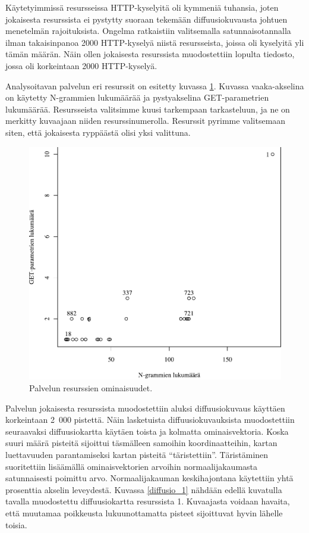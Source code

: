 Käytetyimmissä resursseissa HTTP-kyselyitä oli kymmeniä tuhansia, joten jokaisesta resurssista ei pystytty suoraan tekemään diffuusiokuvausta johtuen
menetelmän rajoituksista. Ongelma ratkaistiin valitsemalla satunnaisotannalla ilman takaisinpanoa 2000 HTTP-kyselyä niistä resursseista, joissa oli 
kyselyitä yli tämän määrän. Näin ollen jokaisesta resurssista muodostettiin lopulta tiedosto, jossa oli korkeintaan 2000 HTTP-kyselyä.

Analysoitavan palvelun eri resurssit on esitetty kuvassa \ref{service_resources}. Kuvassa vaaka-akselina on käytetty N-grammien lukumäärää ja 
pystyakselina GET-parametrien lukumäärää. Resursseista valitsimme kuusi tarkempaan tarkasteluun, ja ne on merkitty kuvaajaan niiden resurssinumerolla. 
Resurssit pyrimme valitsemaan siten, että jokaisesta ryppäästä olisi yksi valittuna.

\begin{figure}[ht]
\centering
\includegraphics[width=13cm]{pics/service_resources.pdf}
\caption{Palvelun resurssien ominaisuudet.}
\label{service_resources}
\end{figure}

Palvelun jokaisesta resurssista muodostettiin aluksi diffuusiokuvaus
käyttäen korkeintaan 2~000 pistettä. Näin lasketuista
diffuusiokuvauksista muodostettiin seuraavaksi diffuusiokartta käytäen
toista ja kolmatta ominaisvektoria.  Koska suuri määrä pisteitä
sijoittui täsmälleen samoihin koordinaatteihin, kartan luettavuuden
parantamiseksi kartan pisteitä ``täristettiin''. Täristäminen
suoritettiin lisäämällä ominaisvektorien arvoihin normaalijakaumasta
satunnaisesti poimittu arvo. Normaalijakauman keskihajontana
käytettiin yhtä prosenttia akselin leveydestä. Kuvassa
\ref{diffusio_1} nähdään edellä kuvatulla tavalla muodostettu
diffuusiokartta resurssista 1. Kuvaajasta voidaan havaita, että
muutamaa poikkeusta lukuunottamatta pisteet sijoittuvat hyvin lähelle
toisia.

